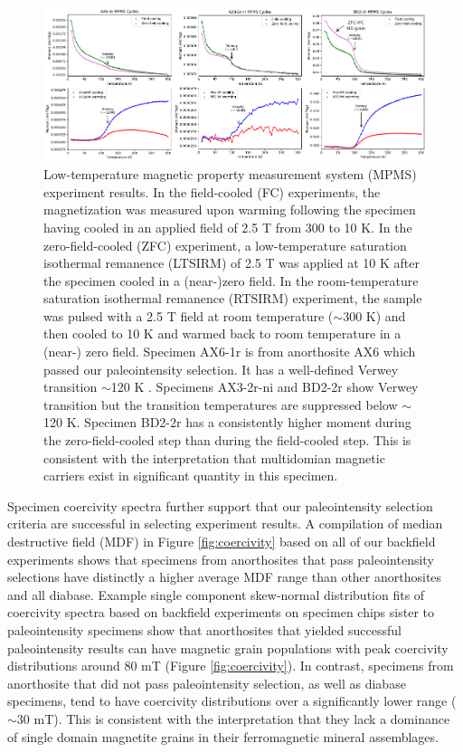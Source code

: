 \documentclass[draft]{agujournal2019}
\begin{document}
\begin{figure}[h!]
\noindent\includegraphics[width=\textwidth]{MPMS.pdf}
\centering
\caption{\footnotesize{Low-temperature magnetic property measurement system (MPMS) experiment results. In the field-cooled (FC) experiments, the magnetization was measured upon warming following the specimen having cooled in an applied field of 2.5 T from 300 to 10 K. In the zero-field-cooled (ZFC) experiment, a low-temperature saturation isothermal remanence (LTSIRM) of 2.5 T was applied at 10 K after the specimen cooled in a (near-)zero field. In the room-temperature saturation isothermal remanence (RTSIRM) experiment, the sample was pulsed with a 2.5 T field at room temperature ($\sim$300 K) and then cooled to 10 K and warmed back to room temperature in a (near-) zero field. Specimen AX6-1r is from anorthosite AX6 which passed our paleointensity selection. It has a well-defined Verwey transition $\sim$120 K \cite{Verwey1939a}. Specimens AX3-2r-ni and BD2-2r show Verwey transition but the transition temperatures are suppressed below $\sim$120 K. Specimen BD2-2r has a consistently higher moment during the zero-field-cooled step than during the field-cooled step. This is consistent with the interpretation that multidomian magnetic carriers exist in significant quantity in this specimen.}}
\label{fig:MPMS}
\end{figure}

Specimen coercivity spectra further support that our paleointensity selection criteria are successful in selecting experiment results. A compilation of median destructive field (MDF) in Figure \ref{fig:coercivity} based on all of our backfield experiments shows that specimens from anorthosites that pass paleointensity selections have distinctly a higher average MDF range than other anorthosites and all diabase. Example single component skew-normal distribution fits of coercivity spectra based on backfield experiments on specimen chips sister to paleointensity specimens show that anorthosites that yielded successful paleointensity results can have magnetic grain populations with peak coercivity distributions around 80 mT (Figure \ref{fig:coercivity}). In contrast, specimens from anorthosite that did not pass paleointensity selection, as well as diabase specimens, tend to have coercivity distributions over a significantly lower range ($\sim$30 mT). This is consistent with the interpretation that they lack a dominance of single domain magnetite grains in their ferromagnetic mineral assemblages.
\end{document}
